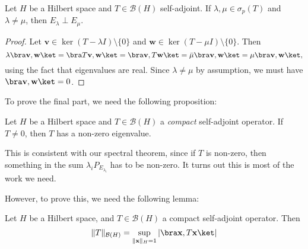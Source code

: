 \documentclass[a4paper]{article}
\begin{document}
\begin{prop}
  Let $H$ be a Hilbert space and $T \in \mathcal{B}(H)$ self-adjoint. If $\lambda, \mu \in \sigma_p(T)$ and $\lambda \not= \mu$, then $E_\lambda \perp E_\mu$.
\end{prop}

\begin{proof}
  Let $\mathbf{v} \in \ker (T - \lambda I)\setminus \{0\}$ and $\mathbf{w} \in \ker(T - \mu I)\setminus \{0\}$. Then
  \[
    \lambda \bra \mathbf{v}, \mathbf{w}\ket = \bra T\mathbf{v}, \mathbf{w}\ket = \bra \mathbf{v}, T \mathbf{w}\ket = \bar{\mu} \bra \mathbf{v}, \mathbf{w}\ket = \mu \bra \mathbf{v}, \mathbf{w}\ket,
  \]
  using the fact that eigenvalues are real. Since $\lambda \not= \mu$ by assumption, we must have $\bra \mathbf{v}, \mathbf{w}\ket = 0$.
\end{proof}

To prove the final part, we need the following proposition:
\begin{prop}
  Let $H$ be a Hilbert space and $T \in \mathcal{B}(H)$ a \emph{compact} self-adjoint operator. If $T \not= 0$, then $T$ has a non-zero eigenvalue.
\end{prop}
This is consistent with our spectral theorem, since if $T$ is non-zero, then something in the sum $\lambda_i P_{E_{\lambda_i}}$ has to be non-zero. It turns out this is most of the work we need.

However, to prove this, we need the following lemma:
\begin{lemma}
  Let $H$ be a Hilbert space, and $T \in \mathcal{B}(H)$ a compact self-adjoint operator. Then
  \[
    \|T\|_{\mathcal{B}(H)} = \sup_{\|\mathbf{x}\|_H = 1} |\bra \mathbf{x}, T \mathbf{x}\ket|
  \]
\end{lemma}
\end{document}
